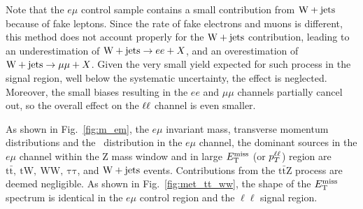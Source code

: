 Note that the $e\mu$ control sample contains a small contribution from
$\mathrm{W}+{\mathrm{jets}}$ because of fake leptons. Since the rate of fake
electrons and muons is different, this method does not account
properly for the $\mathrm{W}+{\mathrm{jets}}$ contribution, leading to an
underestimation of $\mathrm{W}+{\mathrm{jets}}\to ee+X$, and an
overestimation of $\mathrm{W}+{\mathrm{jets}}\to \mu\mu+X$. Given the very 
small yield expected for such process in the signal region, well below
the systematic uncertainty, the effect is neglected.
Moreover, the small biases resulting in the $ee$ and
$\mu\mu$ channels partially cancel out, so the overall effect on the
$\ell\ell$ channel is even smaller. 

As shown in Fig.~\ref{fig:m_em},
the $e\mu$ invariant mass, transverse momentum distributions and the \met\ distribution in
the $e\mu$ channel, the dominant sources in the $e\mu$ channel within
the Z mass window and in large $E_{\mathrm{T}}^{\text{miss}}$ (or $p_{T}^{\ell\ell}$) region are
$\mathrm{t\bar{t}}, \ \mathrm{tW}, \ \mathrm{WW}, \ \mathrm{\tau\tau}$, and $\mathrm{W}+{\mathrm{jets}}$ events.
Contributions from the $\mathrm{t\bar{t}Z}$ process
are deemed negligible.
As shown in Fig.~\ref{fig:met_tt_ww}, the shape of the $E_\mathrm{T}^{\mathrm{miss}}$ spectrum is identical in the $e\mu$ control region
and the $\ell\ell$ signal region.


